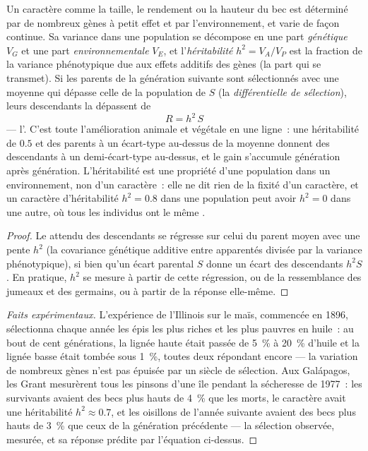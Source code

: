 \begin{theorem}\label{thm:b2:population-genetics:heritability}
Un caractère comme la taille, le rendement ou la hauteur du bec est
déterminé par de nombreux gènes à petit effet et par l'environnement, et
varie de façon continue. Sa variance dans une population se décompose en
une part \emph{génétique} $V_G$ et une part \emph{environnementale} $V_E$, et
l'\emph{héritabilité} $h^{2} = V_A/V_P$ est la fraction de la variance
phénotypique due aux effets additifs des gènes (la part qui se
transmet). Si les parents de la génération suivante sont sélectionnés
avec une moyenne qui dépasse celle de la population de $S$ (la
\emph{différentielle de sélection}), leurs descendants la dépassent de
\[
R = h^{2}\,S
\]
--- l'\emph{}. C'est toute l'amélioration
animale et végétale en une ligne~: une héritabilité de $0.5$ et des
parents à un écart-type au-dessus de la moyenne donnent des descendants
à un demi-écart-type au-dessus, et le gain s'accumule génération après
génération. L'héritabilité est une propriété d'une population dans un
environnement, non d'un caractère~: elle ne dit rien de la fixité d'un
caractère, et un caractère d'héritabilité $h^{2} = 0.8$ dans une population peut
avoir $h^{2} = 0$ dans une autre, où tous les individus ont le même
.
\end{theorem}
\begin{proof}
Le  attendu des descendants se régresse sur celui du parent
moyen avec une pente $h^{2}$ (la covariance génétique additive entre
apparentés divisée par la variance phénotypique), si bien qu'un écart parental $S$
donne un écart des descendants $h^{2}S$. En pratique, $h^{2}$ se
mesure à partir de cette régression, ou de la ressemblance des jumeaux et
des germains, ou à partir de la réponse elle-même.
\end{proof}
\begin{proof}[Faits expérimentaux]
L'expérience de l'Illinois sur le maïs, commencée en 1896, sélectionna
chaque année les épis les plus riches et les plus pauvres en huile~: au
bout de cent générations, la lignée haute était passée de \qty{5}{\%} à
\qty{20}{\%} d'huile et la lignée basse était tombée sous \qty{1}{\%},
toutes deux répondant encore --- la variation de nombreux gènes n'est pas
épuisée par un siècle de sélection. Aux Galápagos, les Grant mesurèrent
tous les pinsons d'une île pendant la sécheresse de 1977~: les survivants
avaient des becs plus hauts de \qty{4}{\%} que les morts, le caractère
avait une héritabilité $h^{2}
\approx 0.7$, et les oisillons de l'année suivante avaient des becs
plus hauts de \qty{3}{\%} que ceux de la génération précédente --- la
sélection observée, mesurée, et sa réponse prédite par l'équation
ci-dessus.
\end{proof}

